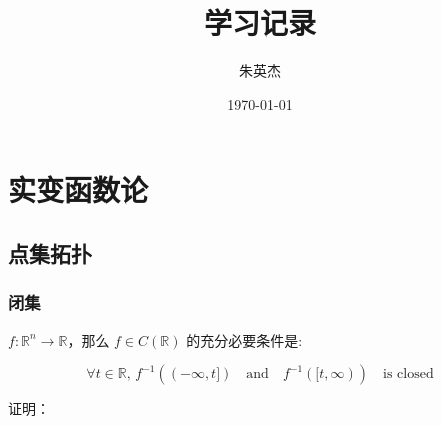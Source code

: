 \documentclass[12pt,a4paper]{ctexart}
\title{学习记录}
\author{朱英杰}
\date{\today}
\begin{document}
\maketitle
\tableofcontents

\section{实变函数论}

\subsection{点集拓扑}

\subsubsection{闭集}

$f: \mathbb{R}^n \to \mathbb{R}$，那么 $f \in C(\mathbb{R})$ 的充分必要条件是:

\[
\forall t \in \mathbb{R},\, f^{-1}((-\infty, t]) \quad \text{and} \quad f^{-1}([t, \infty)) \quad \text{is closed}
\]

证明：
\end{document}
